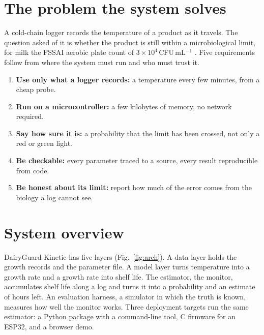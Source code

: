 \section{The problem the system solves}
A cold-chain logger records the temperature of a product as it travels. The question asked of it is whether the product is still within a microbiological limit, for milk the FSSAI aerobic plate count of $3\times10^4$\,CFU\,mL$^{-1}$ \cite{fssai}. Five requirements follow from where the system must run and who must trust it.
\begin{enumerate}
\item \textbf{Use only what a logger records:} a temperature every few minutes, from a cheap probe.
\item \textbf{Run on a microcontroller:} a few kilobytes of memory, no network required.
\item \textbf{Say how sure it is:} a probability that the limit has been crossed, not only a red or green light.
\item \textbf{Be checkable:} every parameter traced to a source, every result reproducible from code.
\item \textbf{Be honest about its limit:} report how much of the error comes from the biology a log cannot see.
\end{enumerate}

\section{System overview}
DairyGuard Kinetic has five layers (Fig.~\ref{fig:arch}). A data layer holds the growth records and the parameter file. A model layer turns temperature into a growth rate and a growth rate into shelf life. The estimator, the monitor, accumulates shelf life along a log and turns it into a probability and an estimate of hours left. An evaluation harness, a simulator in which the truth is known, measures how well the monitor works. Three deployment targets run the same estimator: a Python package with a command-line tool, C firmware for an ESP32, and a browser demo.

